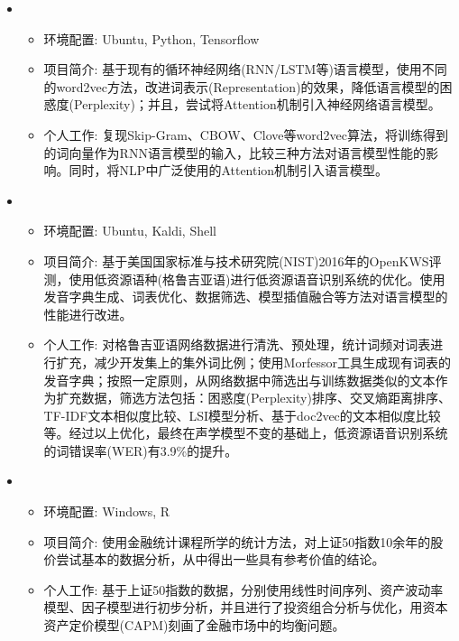   \begin{itemize}[leftmargin=*]
    \item {}
      {\small
      \begin{itemize}
        \item 环境配置: Ubuntu, Python, Tensorflow
        \item 项目简介: 基于现有的循环神经网络(RNN/LSTM等)语言模型，使用不同的word2vec方法，改进词表示(Representation)的效果，降低语言模型的困惑度(Perplexity)；并且，尝试将Attention机制引入神经网络语言模型。
        \item 个人工作: 复现Skip-Gram、CBOW、Clove等word2vec算法，将训练得到的词向量作为RNN语言模型的输入，比较三种方法对语言模型性能的影响。同时，将NLP中广泛使用的Attention机制引入语言模型。
      \end{itemize}
      }

    \item {}
      {\small
      \begin{itemize}
        \item 环境配置: Ubuntu, Kaldi, Shell
        \item 项目简介: 基于美国国家标准与技术研究院(NIST)2016年的OpenKWS评测，使用低资源语种(格鲁吉亚语)进行低资源语音识别系统的优化。使用发音字典生成、词表优化、数据筛选、模型插值融合等方法对语言模型的性能进行改进。
        \item 个人工作: 对格鲁吉亚语网络数据进行清洗、预处理，统计词频对词表进行扩充，减少开发集上的集外词比例；使用Morfessor工具生成现有词表的发音字典；按照一定原则，从网络数据中筛选出与训练数据类似的文本作为扩充数据，筛选方法包括：困惑度(Perplexity)排序、交叉熵距离排序、TF-IDF文本相似度比较、LSI模型分析、基于doc2vec的文本相似度比较等。经过以上优化，最终在声学模型不变的基础上，低资源语音识别系统的词错误率(WER)有3.9\%的提升。
      \end{itemize}
      }

    \item {}
      {\small
      \begin{itemize}
        \item 环境配置: Windows, R
        \item 项目简介: 使用金融统计课程所学的统计方法，对上证50指数10余年的股价尝试基本的数据分析，从中得出一些具有参考价值的结论。
        \item 个人工作: 基于上证50指数的数据，分别使用线性时间序列、资产波动率模型、因子模型进行初步分析，并且进行了投资组合分析与优化，用资本资产定价模型(CAPM)刻画了金融市场中的均衡问题。
      \end{itemize}
      }


\end{itemize}
